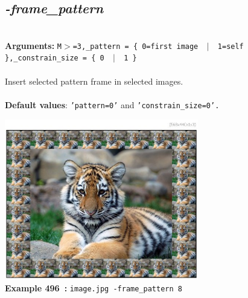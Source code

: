 \documentclass[a4paper,11pt,twoside]{book}
\begin{document}
\subsection{\emph{-frame\_pattern} }\vspace*{-0.5em}
~\\\textbf{Arguments: } 
{\small \texttt{M$>$=3,\_pattern = \{ 0=first image ~$|$~ 1=self \},\_constrain\_size = \{ 0 ~$|$~ 1 \}}}\\~\\
Insert selected pattern frame in selected images.
~\\~\\\textbf{Default values}: {\small \texttt{'pattern=0'} and \texttt{'constrain\_size=0'.}}
\begin{center}\includegraphics[keepaspectratio=true,height=7cm,width=\textwidth]{img/gmic_def496.jpg}\\
{\footnotesize \textbf{Example 496~:} \texttt{image.jpg -frame\_pattern 8}}
\end{center}
\end{document}
